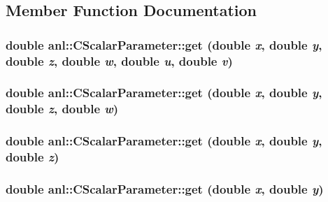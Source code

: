 \subsection{Member Function Documentation}
\hypertarget{classanl_1_1CScalarParameter_a17ece21eccdeaebfd3ae1a153665959a}{
\subsubsection[{get}]{\setlength{\rightskip}{0pt plus 5cm}double anl::CScalarParameter::get (double {\em x}, \/  double {\em y}, \/  double {\em z}, \/  double {\em w}, \/  double {\em u}, \/  double {\em v})}}
\label{classanl_1_1CScalarParameter_a17ece21eccdeaebfd3ae1a153665959a}
\hypertarget{classanl_1_1CScalarParameter_a377e6dc6b39e1c44fddd5228dbe78ff0}{
\subsubsection[{get}]{\setlength{\rightskip}{0pt plus 5cm}double anl::CScalarParameter::get (double {\em x}, \/  double {\em y}, \/  double {\em z}, \/  double {\em w})}}
\label{classanl_1_1CScalarParameter_a377e6dc6b39e1c44fddd5228dbe78ff0}
\hypertarget{classanl_1_1CScalarParameter_a24b5825ba58b04cb806165ee719130e1}{
\subsubsection[{get}]{\setlength{\rightskip}{0pt plus 5cm}double anl::CScalarParameter::get (double {\em x}, \/  double {\em y}, \/  double {\em z})}}
\label{classanl_1_1CScalarParameter_a24b5825ba58b04cb806165ee719130e1}
\hypertarget{classanl_1_1CScalarParameter_af71bbcd788288e8b3f26940fd29262e0}{
\subsubsection[{get}]{\setlength{\rightskip}{0pt plus 5cm}double anl::CScalarParameter::get (double {\em x}, \/  double {\em y})}}
